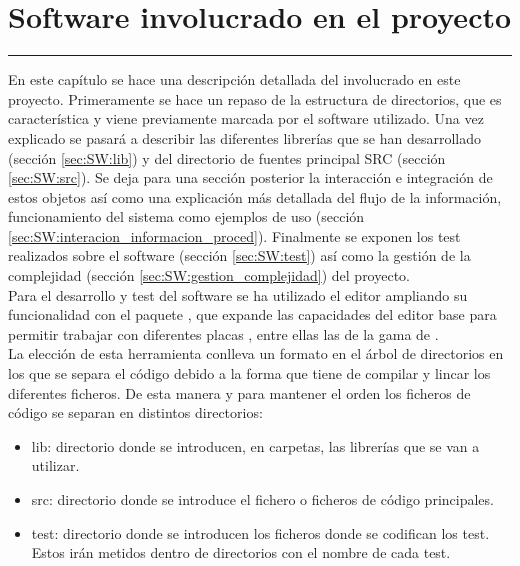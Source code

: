 \chapter{Software involucrado en el proyecto} \label{chap:SW}
\hrule
\vspace{3mm}

    En este capítulo se hace una descripción detallada del  involucrado en este proyecto. Primeramente se hace un repaso de la estructura de directorios, que es característica y viene previamente marcada por el software utilizado. Una vez explicado se pasará a describir las diferentes librerías que se han desarrollado (sección \ref{sec:SW:lib}) y del directorio de fuentes principal SRC (sección \ref{sec:SW:src}). Se deja para una sección posterior la interacción e integración de estos objetos así como una explicación más detallada del flujo de la información, funcionamiento del sistema como ejemplos de uso (sección \ref{sec:SW:interacion_informacion_proced}). Finalmente se exponen los test realizados sobre el software (sección \ref{sec:SW:test}) así como la gestión de la complejidad (sección \ref{sec:SW:gestion_complejidad}) del proyecto.
    \\ 

    Para el desarrollo y test del software se ha utilizado el editor  ampliando su funcionalidad con el paquete , que expande las capacidades del editor base para permitir trabajar con diferentes placas \completar, entre ellas las de la gama de .
    \\ 
    
    La elección de esta herramienta conlleva un formato en el árbol de directorios en los que se separa el código debido a la forma que tiene de compilar y lincar los diferentes ficheros. De esta manera y para mantener el orden los ficheros de código se separan en distintos directorios:
    
    \begin{itemize}
    	\item lib: directorio donde se introducen, en carpetas, las librerías que se van a utilizar.
    	\item src: directorio donde se introduce el fichero o ficheros de código principales.
    	\item test: directorio donde se introducen los ficheros donde se codifican los test. Estos irán metidos dentro de directorios con el nombre de cada test.
    \end{itemize}
    
